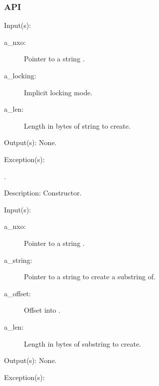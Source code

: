 \subsubsection{API}
\begin{capi}
\label{nxo_string_new}
	\begin{capilist}
	\item[Input(s): ]
		\begin{description}\item[]
		\item[a\_nxo: ]
			Pointer to a string .
		\item[a\_locking: ]
			Implicit locking mode.
		\item[a\_len: ]
			Length in bytes of string to create.
		\end{description}
	\item[Output(s): ] None.
	\item[Exception(s): ]
		\begin{description}\item[]
		\item[.]
		\end{description}
	\item[Description: ]
		Constructor.
	\end{capilist}
\label{nxo_string_substring_new}
	\begin{capilist}
	\item[Input(s): ]
		\begin{description}\item[]
		\item[a\_nxo: ]
			Pointer to a string \classname{nxo}.
		\item[a\_string: ]
			Pointer to a string  to create a
			substring of.
		\item[a\_offset: ]
			Offset into \cvar{a\_string}.
		\item[a\_len: ]
			Length in bytes of substring to create.
		\end{description}
	\item[Output(s): ] None.
	\item[Exception(s): ]
		\begin{description}\item[]

\end{description}
\end{capilist}
\end{capi}
